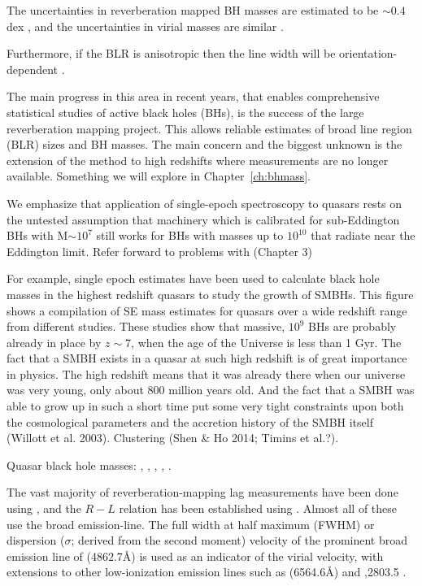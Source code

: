 The uncertainties in reverberation mapped BH masses are estimated to be $\sim 0.4$ dex \citep[e.g.][]{peterson10}, and the uncertainties in virial masses are similar \citep[e.g.][]{vestergaard06}.

Furthermore, if the BLR is anisotropic \citep[for example, in a flattened disk; e.g.][]{jarvis06} then the line width will be orientation-dependent \citep[e.g.][]{runnoe13b,shen14,brotherton15}. 

The main progress in this area in recent years, that enables comprehensive statistical studies of active black holes (BHs), is the success of the large reverberation mapping project. 
This allows reliable estimates of broad line region (BLR) sizes and BH masses. 
The main concern and the biggest unknown is the extension of the method to high redshifts where \hb measurements are no longer available. 
Something we will explore in Chapter~\ref{ch:bhmass}. 

We emphasize that application of single-epoch spectroscopy to quasars rests on the untested assumption that machinery which is calibrated for sub-Eddington BHs with M$\sim10^7$ still works for BHs with masses up to $10^{10}$ that radiate near the Eddington limit. 
Refer forward to problems with  (Chapter 3)

For example, single epoch estimates have been used to calculate black hole masses in the highest redshift quasars to study the growth of SMBHs. 
This figure shows a compilation of SE mass estimates for quasars over a wide redshift range from different studies. 
These studies show that massive, $10^9$ BHs are probably already in place by $z\sim7$, when the age of the Universe is less than 1 Gyr.
The fact that a SMBH exists in a quasar at such high redshift is of great importance in physics.
The high redshift means that it was already there when our universe was very young, only about
800 million years old. And the fact that a SMBH was able to grow up in such a short time put
some very tight constraints upon both the cosmological parameters and the accretion history of the
SMBH itself (Willott et al. 2003).
Clustering (Shen \& Ho 2014; Timins et al.?). 

Quasar black hole masses: \citet{shen13}, \citet{peterson10}, \citet{peterson11}, \citet{vestergaard11}, \citet{marziani12}. 


The vast majority of reverberation-mapping lag measurements have been done using \hbns, and the $R-L$ relation has been established using \hbns. 
Almost all of these use the broad \hb emission-line.
The full width at half maximum (FWHM) or dispersion ($\sigma$; derived from the second moment) velocity of the prominent broad emission line of \hb (4862.7\AA) is used as an indicator of the virial velocity, with extensions to other low-ionization emission lines such as \ha (6564.6\AA) and ,2803.5 \citep[e.g.][]{vestergaard02,mclure02,wu04,kollmeier06,onken08,wang09,rafiee11}.



